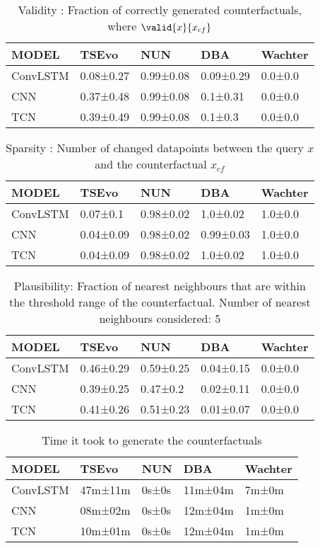 \begin{table}[h!]
\centering
\small
\begin{tabular}{lllll}
\toprule MODEL & TSEvo & NUN & DBA & Wachter \\ \toprule
ConvLSTM & 0.08±0.27 & 0.99±0.08 & 0.09±0.29 & 0.0±0.0 \\
CNN & 0.37±0.48 & 0.99±0.08 & 0.1±0.31 & 0.0±0.0 \\
TCN & 0.39±0.49 & 0.99±0.08 & 0.1±0.3 & 0.0±0.0 \\
\bottomrule \end{tabular}\label{tab:validity}
\caption{Validity : Fraction of correctly generated counterfactuals, where $\valid{x}{x_{c f}}$}
\end{table}


\begin{table}[h!]
\centering
\small

\begin{tabular}{lllll}
\toprule MODEL & TSEvo & NUN & DBA & Wachter \\ \toprule
ConvLSTM & 0.07±0.1 & 0.98±0.02 & 1.0±0.02 & 1.0±0.0 \\
CNN & 0.04±0.09 & 0.98±0.02 & 0.99±0.03 & 1.0±0.0 \\
TCN & 0.04±0.09 & 0.98±0.02 & 1.0±0.02 & 1.0±0.0 \\
\bottomrule \end{tabular}\label{tab:sparsity}
\caption{Sparsity : Number of changed datapoints between the query $x$ and the counterfactual $x_{c f}$}
\end{table}

\begin{table}[h!]
\centering
\small
\begin{tabular}{lllll}
\toprule MODEL & TSEvo & NUN & DBA & Wachter \\ \toprule
ConvLSTM & 0.46±0.29 & 0.59±0.25 & 0.04±0.15 & 0.0±0.0 \\
CNN & 0.39±0.25 & 0.47±0.2 & 0.02±0.11 & 0.0±0.0 \\
TCN & 0.41±0.26 & 0.51±0.23 & 0.01±0.07 & 0.0±0.0 \\
\bottomrule \end{tabular}\label{tab:plausibility}
\caption{Plausibility: Fraction of nearest neighbours that are within the threshold range of the counterfactual. Number of nearest neighbours considered: 5}
\end{table}

\begin{table}[h!]
\centering
\small
\begin{tabular}{lllll}
\toprule MODEL & TSEvo & NUN & DBA & Wachter \\ \toprule
ConvLSTM & 47m±11m & 0s±0s & 11m±04m & 7m±0m \\
CNN & 08m±02m & 0s±0s & 12m±04m & 1m±0m \\
TCN & 10m±01m& 0s±0s & 12m±04m & 1m±0m \\
\bottomrule \end{tabular}\label{tab:time}
\caption{Time it took to generate the counterfactuals}
\end{table}


